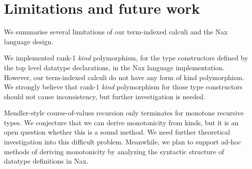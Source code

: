 
\section{Limitations and future work}\label{sec:concl:fw}
We summarise several limitations of our term-indexed calculi and
the Nax language design.

We implemented rank-1 {\it kind} polymorphism, for the type constructors
defined by the top level datatype declarations, in the Nax language
implementation. However, our term-indexed calculi do not have any form of
kind polymorphism. We strongly believe that rank-1 {\it kind} polymorphism
for those type constructors should not cause inconsistency,
but further investigation is needed.

Mendler-style course-of-values recursion only terminates
for monotone recursive types.
We conjecture that we can derive monotonicity from kinds,
but it is an open question whether this is a sound method. We need further
theoretical investigation into this difficult problem.
Meanwhile, we plan to support ad-hoc methods of deriving monotonicity
by analyzing the syntactic structure of datatype definitions in Nax.

